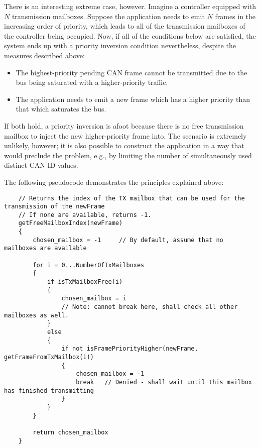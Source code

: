 \begin{remark}[breakable]
    There is an interesting extreme case, however.
    Imagine a controller equipped with $N$ transmission mailboxes.
    Suppose the application needs to emit $N$ frames in the increasing order of priority,
    which leads to all of the transmission mailboxes of the controller being occupied.
    Now, if all of the conditions below are satisfied, the system ends up with a priority inversion condition
    nevertheless, despite the measures described above:

    \begin{itemize}
        \item The highest-priority pending CAN frame cannot be transmitted due to the bus being saturated
        with a higher-priority traffic.
        \item The application needs to emit a new frame which has a higher priority than that which saturates the bus.
    \end{itemize}

    If both hold, a priority inversion is afoot because there is no free transmission mailbox to
    inject the new higher-priority frame into.
    The scenario is extremely unlikely, however;
    it is also possible to construct the application in a way that would preclude the problem,
    e.g., by limiting the number of simultaneously used distinct CAN ID values.

    The following pseudocode demonstrates the principles explained above:

    \begin{samepage}
    \begin{verbatim}
    // Returns the index of the TX mailbox that can be used for the transmission of the newFrame
    // If none are available, returns -1.
    getFreeMailboxIndex(newFrame)
    {
        chosen_mailbox = -1     // By default, assume that no mailboxes are available

        for i = 0...NumberOfTxMailboxes
        {
            if isTxMailboxFree(i)
            {
                chosen_mailbox = i
                // Note: cannot break here, shall check all other mailboxes as well.
            }
            else
            {
                if not isFramePriorityHigher(newFrame, getFrameFromTxMailbox(i))
                {
                    chosen_mailbox = -1
                    break   // Denied - shall wait until this mailbox has finished transmitting
                }
            }
        }

        return chosen_mailbox
    }
    \end{verbatim}
    \end{samepage}
\end{remark}

